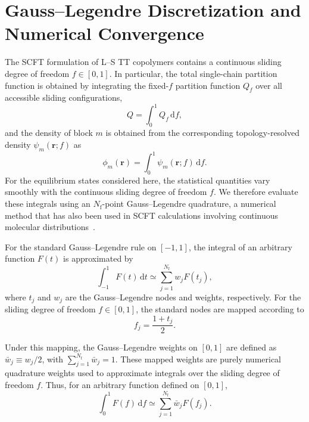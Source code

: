 \documentclass[journal=mamobx,manuscript=article]{achemso}
\begin{document}
\section{Gauss--Legendre Discretization and Numerical Convergence}\label{sec:GaussLegendre}

	The SCFT formulation of L--S TT copolymers contains a continuous sliding degree of freedom $f\in[0,1]$.
	In particular, the total single-chain partition function is obtained by integrating the fixed-$f$ partition function $Q_f$ over all accessible sliding configurations,
	\begin{equation}
		Q
		=
		\int_0^1 Q_f\,\mathrm df,
		\label{eq:ContinuousPartition}
	\end{equation}
	and the density of block $m$ is obtained from the corresponding topology-resolved density $\psi_m(\bm r;f)$ as
	\begin{equation}
		\phi_m(\bm r)
		=
		\int_0^1
		\psi_m(\bm r;f)\,\mathrm df.
		\label{eq:ContinuousDensity}
	\end{equation}
	For the equilibrium states considered here, the statistical quantities vary smoothly with the continuous sliding degree of freedom $f$.
	We therefore evaluate these integrals using an $N_{\mathrm f}$-point Gauss--Legendre quadrature, a numerical method that has also been used in SCFT calculations involving continuous molecular distributions~\cite{Koski2013Field,Sides2004Continuous}.


	For the standard Gauss--Legendre rule on $[-1,1]$, the integral of an arbitrary function $F(t)$ is approximated by
	\begin{equation}
		\int_{-1}^{1}F(t)\,\mathrm dt
		\simeq
		\sum_{j=1}^{N_{\mathrm f}}
		w_jF(t_j),
		\label{eq:GaussLegendre}
	\end{equation}
	where $t_j$ and $w_j$ are the Gauss--Legendre nodes and weights, respectively.
	For the sliding degree of freedom $f\in[0,1]$, the standard nodes are mapped according to
	\begin{equation}
		f_j=\frac{1+t_j}{2}.
		\label{eq:GaussLegendreNodes}
	\end{equation}
	 
	Under this mapping, the Gauss--Legendre weights on $[0,1]$ are defined as $\bar w_j\equiv w_j/2$, with $\sum_{j=1}^{N_{\mathrm f}}\bar w_j=1$.
	These mapped weights are purely numerical quadrature weights used to approximate integrals over the sliding degree of freedom $f$.
	Thus, for an arbitrary function defined on $[0,1]$,
	\begin{equation}
		\int_0^1F(f)\,\mathrm df
		\simeq
		\sum_{j=1}^{N_{\mathrm f}}
		\bar{w}_j F(f_j).
		\label{eq:GaussLegendreMap}
	\end{equation}
\end{document}
